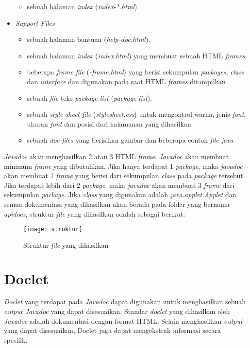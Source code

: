 \begin{itemize}
\begin{itemize}
		\item sebuah halaman {\it index} ({\it index-*.html}).
	\end{itemize}
	\item {\it Support Files}
	\begin{itemize}
		\item sebuah halaman bantuan ({\it help-doc.html}).
		\item sebuah halaman {\it index} ({\it index.html}) yang membuat sebuah HTML {\it frames}.
		\item beberapa {\it frame file} ({\it *-frame.html}) yang berisi sekumpulan {\it packages}, {\it class} dan {\it interface} dan digunakan pada saat HTML {\it frames} ditampilkan
		\item sebuah {\it file} teks {\it package list} ({\it package-list}).
		\item sebuah {\it style sheet file} ({\it stylesheet.css}) untuk mengontrol warna, jenis {\it font}, ukuran {\it font} dan posisi dari halamanan yang dihasilkan
		\item sebuah {\it doc-files} yang berisikan gambar dan beberapa contoh {\it file java}
	\end{itemize}
\end{itemize}
{\it Javadoc} akan menghasilkan 2 atau 3 HTML {\it frame}. {\it Javadoc} akan membuat minimum {\it frame} yang dibutuhkan. Jika hanya terdapat 1 {\it package}, maka {\it javadoc} akan membuat 1 {\it frame} yang berisi dari sekumpulan {\it class} pada {\it package} tersebut. Jika terdapat lebih dari 2 {\it package}, maka {\it javadoc} akan membuat 3 {\it frame} dari sekumpulan {\it package}. Jika {\it class} yang digunakan adalah {\it java.applet.Applet} dan semua dokumentasi yang dihasilkan akan berada pada folder yang bernama {\it apidocs}, struktur {\it file} yang dihasilkan adalah sebagai berikut:
\begin{figure}[H]
	\centering  
	\texttt{[image: struktur]}  
	\caption[Struktur {\it file} yang dihasilkan]{Struktur {\it file} yang dihasilkan} 
	\label{fig:strukture} 
\end{figure}

\section{Doclet}
\label{sec:doclet}
{\it Doclet} yang terdapat pada {\it Javadoc} dapat digunakan untuk menghasilkan sebuah {\it output Javadoc} yang dapat disesuaikan. Standar {\it doclet} yang dihasilkan oleh {\it Javadoc} adalah dokumentasi dengan format HTML. Selain menghasilkan {\it output} yang dapat disesuaikan, Doclet juga dapat mengekstrak informasi secara spesifik.~\cite{doclet:02:doclet}

